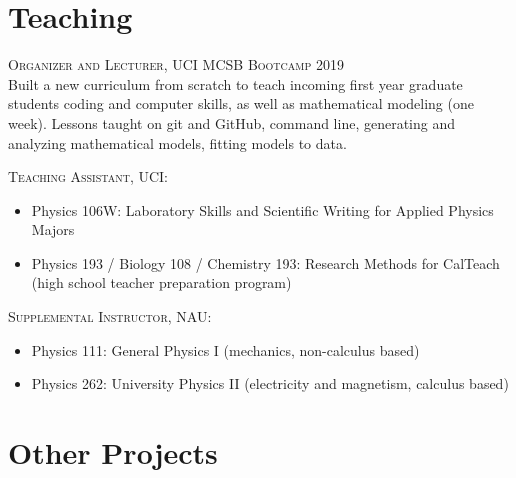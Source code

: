\documentclass[letterpaper,10pt]{article} %
\begin{document}
\section*{Teaching}
\bigskip

\begin{description}

\item \textsc{Organizer and Lecturer, UCI MCSB Bootcamp 2019}
 \\ Built a new curriculum from scratch to teach incoming first year graduate students coding and computer skills, as well as mathematical modeling (one week). Lessons taught on git and GitHub, command line, generating and analyzing mathematical models, fitting models to data.
 
\item \textsc{Teaching Assistant, UCI:}
\begin{itemize}
\item Physics 106W: Laboratory Skills and Scientific Writing for Applied Physics Majors
\item Physics 193 / Biology 108 / Chemistry 193: Research Methods for CalTeach (high school
teacher preparation program)
\end{itemize}

\item \textsc{Supplemental Instructor, NAU:}
\begin{itemize}
\item Physics 111: General Physics I (mechanics, non-calculus based)
\item Physics 262: University Physics II (electricity and magnetism, calculus based)
\end{itemize}

\end{description}

\bigskip
\section{Other Projects}
\bigskip
\end{document}
